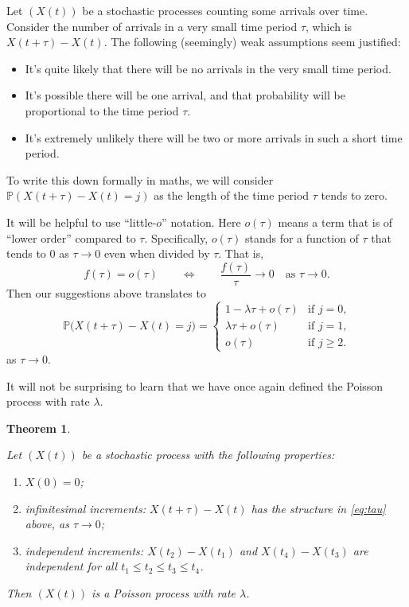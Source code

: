 \documentclass[
  a4paper,
]{article}
\providecommand{\tightlist}{%
  \setlength{\itemsep}{0pt}\setlength{\parskip}{0pt}}
\newtheorem{theorem}{Theorem}[section]
\theoremstyle{definition}
\theoremstyle{definition}
\theoremstyle{definition}
\theoremstyle{remark}
\begin{document}
Let \((X(t))\) be a stochastic processes counting some arrivals over time. Consider the number of arrivals in a very small time period \(\tau\), which is \(X(t+\tau) - X(t)\). The following (seemingly) weak assumptions seem justified:

\begin{itemize}
\tightlist
\item
  It's quite likely that there will be no arrivals in the very small time period.
\item
  It's possible there will be one arrival, and that probability will be proportional to the time period \(\tau\).
\item
  It's extremely unlikely there will be two or more arrivals in such a short time period.
\end{itemize}

To write this down formally in maths, we will consider \(\mathbb P(X(t+\tau) - X(t) = j)\) as the length of the time period \(\tau\) tends to zero.

It will be helpful to use ``little-\(o\)'' notation. Here \(o(\tau)\) means a term that is of ``lower order'' compared to \(\tau\). Specifically, \(o(\tau)\) stands for a function of \(\tau\) that tends to \(0\) as \(\tau \to 0\) even when divided by \(\tau\). That is,
\[ f(\tau) = o(\tau) \qquad \iff \qquad \frac{f(\tau)}{\tau} \to 0 \quad \text{as $\tau \to 0$.}  \]
Then our suggestions above translates to
\begin{equation} \mathbb P \big(X(t+\tau) - X(t) = j\big) = \begin{cases} 1 - \lambda \tau + o(\tau) & \text{if $j = 0$,} \\
\lambda\tau + o(\tau) & \text{if $j = 1$,} \\
o(\tau) & \text{if $j \geq 2$.} \end{cases} \label{eq:tau} \end{equation}
as \(\tau \to 0\).

It will not be surprising to learn that we have once again defined the Poisson process with rate \(\lambda\).

\begin{theorem}
\protect\hypertarget{thm:def-inf}{}\label{thm:def-inf}

Let \((X(t))\) be a stochastic process with the following properties:

\begin{enumerate}
\def\labelenumi{\arabic{enumi}.}
\tightlist
\item
  \(X(0) = 0\);
\item
  infinitesimal increments: \(X(t+\tau) - X(t)\) has the structure in \eqref{eq:tau} above, as \(\tau \to 0\);
\item
  independent increments: \(X(t_2) - X(t_1)\) and \(X(t_4) - X(t_3)\) are independent for all \(t_1 \leq t_2 \leq t_3 \leq t_4\).
\end{enumerate}

Then \((X(t))\) is a Poisson process with rate \(\lambda\).

\end{theorem}
\end{document}
